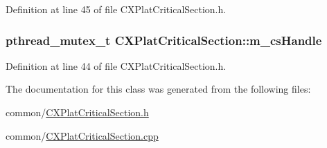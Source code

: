 \-Definition at line 45 of file \-C\-X\-Plat\-Critical\-Section.\-h.

\hypertarget{class_c_x_plat_critical_section_aa7bacade5b04643e1a50122a0ba38fc5}{
\subsubsection[{m\-\_\-cs\-Handle}]{\setlength{\rightskip}{0pt plus 5cm}pthread\-\_\-mutex\-\_\-t {\bf \-C\-X\-Plat\-Critical\-Section\-::m\-\_\-cs\-Handle}}}\label{class_c_x_plat_critical_section_aa7bacade5b04643e1a50122a0ba38fc5}


\-Definition at line 44 of file \-C\-X\-Plat\-Critical\-Section.\-h.



\-The documentation for this class was generated from the following files\-:\begin{DoxyCompactItemize}
\item 
common/\hyperlink{_c_x_plat_critical_section_8h}{\-C\-X\-Plat\-Critical\-Section.\-h}\item 
common/\hyperlink{_c_x_plat_critical_section_8cpp}{\-C\-X\-Plat\-Critical\-Section.\-cpp}\end{DoxyCompactItemize}
